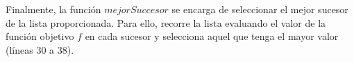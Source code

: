 Finalmente, la función $mejorSuccesor$ se encarga de seleccionar el mejor sucesor de la lista proporcionada.
Para ello, recorre la lista evaluando el valor de la función objetivo $f$ en
cada sucesor y selecciona aquel que tenga el mayor valor (líneas 30 a 38).


%
%




